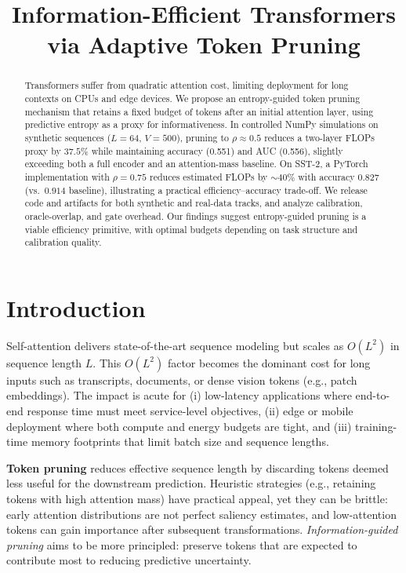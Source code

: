 \documentclass{article}
\title{Information-Efficient Transformers via Adaptive Token Pruning}
\author{}
\date{}
\newcommand{\Lseq}{L}
\begin{document}
\maketitle

\begin{abstract}
Transformers suffer from quadratic attention cost, limiting deployment for long contexts on CPUs and edge devices. 
We propose an entropy-guided token pruning mechanism that retains a fixed budget of tokens after an initial attention layer, using predictive entropy as a proxy for informativeness. 
In controlled NumPy simulations on synthetic sequences ($L{=}64$, $V{=}500$), pruning to $\rho \approx 0.5$ reduces a two-layer FLOPs proxy by $37.5\%$ while maintaining accuracy (0.551) and AUC (0.556), slightly exceeding both a full encoder and an attention-mass baseline. 
On SST-2, a PyTorch implementation with $\rho{=}0.75$ reduces estimated FLOPs by ${\sim}40\%$ with accuracy $0.827$ (vs.\ $0.914$ baseline), illustrating a practical efficiency–accuracy trade-off. 
We release code and artifacts for both synthetic and real-data tracks, and analyze calibration, oracle-overlap, and gate overhead. 
Our findings suggest entropy-guided pruning is a viable efficiency primitive, with optimal budgets depending on task structure and calibration quality.

\end{abstract}



\section{Introduction}
\label{sec:intro}
Self-attention delivers state-of-the-art sequence modeling but scales as $O(\Lseq^2)$ in sequence length $\Lseq$. This $O(\Lseq^2)$ factor becomes the dominant cost for long inputs such as transcripts, documents, or dense vision tokens (e.g., patch embeddings). The impact is acute for (i) low-latency applications where end-to-end response time must meet service-level objectives, (ii) edge or mobile deployment where both compute and energy budgets are tight, and (iii) training-time memory footprints that limit batch size and sequence lengths.

\textbf{Token pruning} reduces effective sequence length by discarding tokens deemed less useful for the downstream prediction. Heuristic strategies (e.g., retaining tokens with high attention mass) have practical appeal, yet they can be brittle: early attention distributions are not perfect saliency estimates, and low-attention tokens can gain importance after subsequent transformations. \emph{Information-guided pruning} aims to be more principled: preserve tokens that are expected to contribute most to reducing predictive uncertainty.
\end{document}
